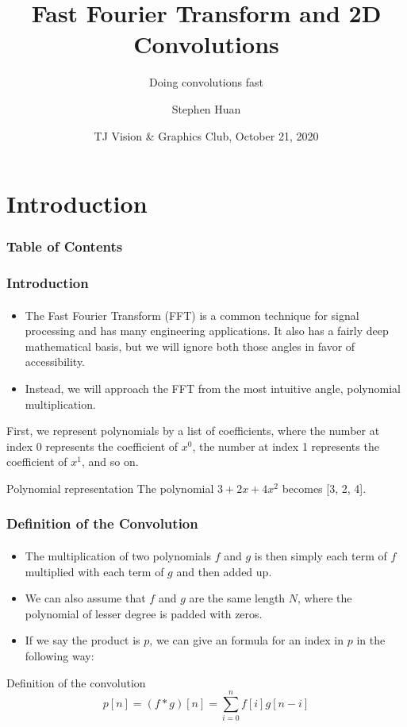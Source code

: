 \documentclass{beamer}                             %
\title[FFT]{Fast Fourier Transform and 2D Convolutions}
\subtitle{Doing convolutions fast}
\author[Huan]{Stephen Huan\inst{1}}
\institute[TJHSST]
{
  \inst{1}
  Thomas Jefferson High School for Science and Technology
}
\date[]{TJ Vision \& Graphics Club, October 21, 2020}
\begin{document}
\frame{\titlepage}

\section{Introduction}
\begin{frame}
\frametitle{Table of Contents}
\tableofcontents[currentsection]
\end{frame}

\begin{frame}
\frametitle{Introduction}
\framesubtitle{}
\begin{itemize}
  \item The Fast Fourier Transform (FFT) is a common technique for signal
    processing and has many engineering applications. It also has a fairly
    deep mathematical basis, but we will ignore both those angles in favor
    of accessibility.
  \item Instead, we will approach the FFT from the most
    intuitive angle, \alert{polynomial multiplication}. \pause
\end{itemize}

First, we represent polynomials by a list of coefficients,
where the number at index 0 represents the coefficient of \( x^0 \),
the number at index 1 represents the coefficient of \( x^1 \), and so on.
\begin{exampleblock}{Polynomial representation}
  The polynomial \( 3 + 2x + 4x^2 \) becomes [3, 2, 4].
\end{exampleblock}
\end{frame}

\begin{frame}
\frametitle{Definition of the Convolution}
\framesubtitle{}
\begin{itemize}
  \item The multiplication of two polynomials \( f \)
    and \( g \) is then simply each term of \( f \)
    multiplied with each term of \( g \) and then added up.
  \item We can also assume that \( f \) and \( g \) are the same length
    \( N \), where the polynomial of lesser degree is padded with zeros.
  \item If we say the product is \( p \), we can give an
    formula for an index in \( p \) in the following way:
\end{itemize}

\begin{alertblock}{Definition of the convolution}
  \[ p[n] = (f * g)[n] = \sum^n_{i = 0} f[i]g[n - i] \]
\end{alertblock}
\end{frame}
\end{document}
